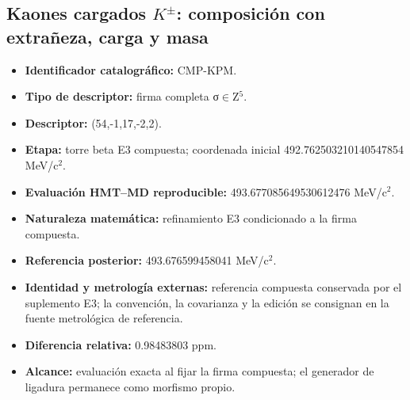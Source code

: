 \subsection{Kaones cargados \(K^\pm\): composición con extrañeza, carga y masa}
\begin{itemize}
\item \textbf{Identificador catalográfico:} CMP-KPM.
\item \textbf{Tipo de descriptor:} firma completa σ\(\in\)Z\({}^{5}\).
\item \textbf{Descriptor:} (54,-1,17,-2,2).
\item \textbf{Etapa:} torre beta E3 compuesta; coordenada inicial 492.762503\allowbreak{}210140\allowbreak{}547854 MeV/c\({}^{2}\).
\item \textbf{Evaluación HMT--MD reproducible:} 493.677085\allowbreak{}649530\allowbreak{}612476 MeV/c\({}^{2}\).
\item \textbf{Naturaleza matemática:} refinamiento E3 condicionado a la firma compuesta.
\item \textbf{Referencia posterior:} 493.676599\allowbreak{}458041 MeV/c\({}^{2}\).
\item \textbf{Identidad y metrología externas:} referencia compuesta conservada por el suplemento E3; la convención, la covarianza y la edición se consignan en la fuente metrológica de referencia.
\item \textbf{Diferencia relativa:} 0.984838\allowbreak{}03 ppm.
\item \textbf{Alcance:} evaluación exacta al fijar la firma compuesta; el generador de ligadura permanece como morfismo propio.
\end{itemize}
